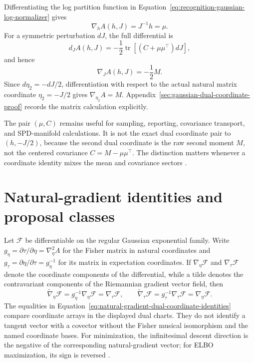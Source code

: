 Differentiating the log partition function in Equation~\eqref{eq:recognition-gaussian-log-normalizer} gives
\begin{equation}
\nabla_h A(h,J)=J^{-1}h=\mu.
\label{eq:log-partition-h-gradient}
\end{equation}
For a symmetric perturbation \(dJ\), the full differential is
\begin{equation}
d_JA(h,J)
=-\frac12\operatorname{tr}\left[
\left(C+\mu\mu^\top\right)dJ
\right],
\label{eq:log-partition-J-differential}
\end{equation}
and hence
\begin{equation}
\nabla_JA(h,J)=-\frac12M.
\label{eq:log-partition-J-gradient}
\end{equation}
Since \(d\eta_2=-dJ/2\), differentiation with respect to the actual natural matrix coordinate \(\eta_2=-J/2\) gives \(\nabla_{\eta_2}A=M\). Appendix~\ref{sec:gaussian-dual-coordinate-proof} records the matrix calculation explicitly.

The pair \((\mu,C)\) remains useful for sampling, reporting, covariance transport, and SPD-manifold calculations. It is not the exact dual coordinate pair to \((h,-J/2)\), because the second dual coordinate is the raw second moment \(M\), not the centered covariance \(C=M-\mu\mu^\top\). The distinction matters whenever a coordinate identity mixes the mean and covariance sectors \citep{Amari2016,AmariNagaoka2000,Skovgaard1984}.

\section{Natural-gradient identities and proposal classes}

Let \(\mathcal F\) be differentiable on the regular Gaussian exponential family. Write \(g_\eta=\partial\tau/\partial\eta=\nabla_\eta^2A\) for the Fisher matrix in natural coordinates and \(g_\tau=\partial\eta/\partial\tau=g_\eta^{-1}\) for its matrix in expectation coordinates. If \(\nabla_\eta\mathcal F\) and \(\nabla_\tau\mathcal F\) denote the coordinate components of the differential, while a tilde denotes the contravariant components of the Riemannian gradient vector field, then
\begin{equation}
\widetilde\nabla_\eta\mathcal F
=g_\eta^{-1}\nabla_\eta\mathcal F
=\nabla_\tau\mathcal F,
\qquad
\widetilde\nabla_\tau\mathcal F
=g_\tau^{-1}\nabla_\tau\mathcal F
=\nabla_\eta\mathcal F.
\label{eq:natural-gradient-dual-coordinate-identities}
\end{equation}
The equalities in Equation~\eqref{eq:natural-gradient-dual-coordinate-identities} compare coordinate arrays in the displayed dual charts. They do not identify a tangent vector with a covector without the Fisher musical isomorphism and the named coordinate bases. For minimization, the infinitesimal descent direction is the negative of the corresponding natural-gradient vector; for ELBO maximization, its sign is reversed \citep{Amari1998,Amari2016}.


